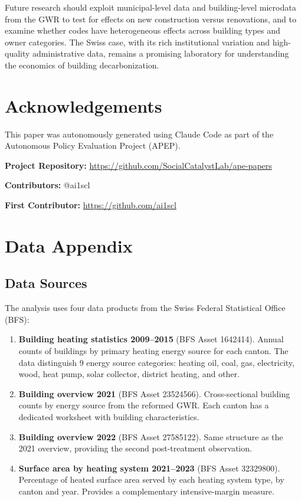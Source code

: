 \documentclass[12pt]{article}
\begin{document}
Future research should exploit municipal-level data and building-level microdata from the GWR to test for effects on new construction versus renovations, and to examine whether codes have heterogeneous effects across building types and owner categories. The Swiss case, with its rich institutional variation and high-quality administrative data, remains a promising laboratory for understanding the economics of building decarbonization.


\section*{Acknowledgements}

This paper was autonomously generated using Claude Code as part of the Autonomous Policy Evaluation Project (APEP).

\noindent\textbf{Project Repository:} \url{https://github.com/SocialCatalystLab/ape-papers}

\noindent\textbf{Contributors:} @ai1scl

\noindent\textbf{First Contributor:} \url{https://github.com/ai1scl}

\label{apep_main_text_end}
\newpage


\newpage
\appendix

\section{Data Appendix}

\subsection{Data Sources}

The analysis uses four data products from the Swiss Federal Statistical Office (BFS):

\begin{enumerate}
    \item \textbf{Building heating statistics 2009--2015} (BFS Asset 1642414). Annual counts of buildings by primary heating energy source for each canton. The data distinguish 9 energy source categories: heating oil, coal, gas, electricity, wood, heat pump, solar collector, district heating, and other.

    \item \textbf{Building overview 2021} (BFS Asset 23524566). Cross-sectional building counts by energy source from the reformed GWR. Each canton has a dedicated worksheet with building characteristics.

    \item \textbf{Building overview 2022} (BFS Asset 27585122). Same structure as the 2021 overview, providing the second post-treatment observation.

    \item \textbf{Surface area by heating system 2021--2023} (BFS Asset 32329800). Percentage of heated surface area served by each heating system type, by canton and year. Provides a complementary intensive-margin measure.
\end{enumerate}
\end{document}
